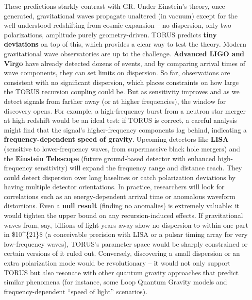 \documentclass[
]{article}
\begin{document}
These predictions starkly contrast with GR. Under Einstein's theory,
once generated, gravitational waves propagate unaltered (in vacuum)
except for the well-understood redshifting from cosmic expansion -- no
dispersion, only two polarizations, amplitude purely geometry-driven.
TORUS predicts \textbf{tiny deviations} on top of this, which provides a
clear way to test the theory. Modern gravitational wave observatories
are up to the challenge. \textbf{Advanced LIGO and Virgo} have already
detected dozens of events, and by comparing arrival times of wave
components, they can set limits on dispersion. So far, observations are
consistent with no significant dispersion, which places constraints on
how large the TORUS recursion coupling could be. But as sensitivity
improves and as we detect signals from farther away (or at higher
frequencies), the window for discovery opens. For example, a
high-frequency burst from a neutron star merger at high redshift would
be an ideal test: if TORUS is correct, a careful analysis might find
that the signal's higher-frequency components lag behind, indicating a
\textbf{frequency-dependent speed of gravity}\hspace{0pt}. Upcoming
detectors like \textbf{LISA} (sensitive to lower-frequency waves, from
supermassive black hole mergers) and the \textbf{Einstein Telescope}
(future ground-based detector with enhanced high-frequency sensitivity)
will expand the frequency range and distance reach. They could detect
dispersion over long baselines or catch polarization deviations by
having multiple detector orientations. In practice, researchers will
look for correlations such as an energy-dependent arrival time or
anomalous waveform distortions. Even a \textbf{null result} (finding no
anomalies) is extremely valuable: it would tighten the upper bound on
any recursion-induced effects. If gravitational waves from, say,
billions of light years away show no dispersion to within one part in
\$10\^{}\{21\}\$ (a conceivable precision with LISA or a pulsar timing
array for very low-frequency waves), TORUS's parameter space would be
sharply constrained or certain versions of it ruled out\hspace{0pt}.
Conversely, discovering a small dispersion or an extra polarization mode
would be revolutionary -- it would not only support TORUS but also
resonate with other quantum gravity approaches that predict similar
phenomena (for instance, some Loop Quantum Gravity models and
frequency-dependent ``speed of light'' scenarios)\hspace{0pt}.
\end{document}

